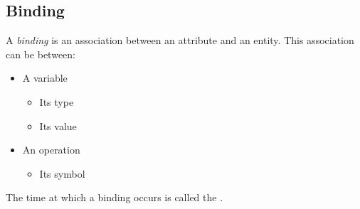 \subsection{Binding}\label{subsec:Binding}
\begin{definition}[Binding]\label{def:Binding}
  A \emph{binding} is an association between an attribute and an entity.
  This association can be between:
  \begin{itemize}[noitemsep]
  \item A variable
    \begin{itemize}[noitemsep]
    \item Its type
    \item Its value
    \end{itemize}
  \item An operation
    \begin{itemize}[noitemsep]
    \item Its symbol
    \end{itemize}
  \end{itemize}

  The time at which a binding occurs is called the .
\end{definition}

